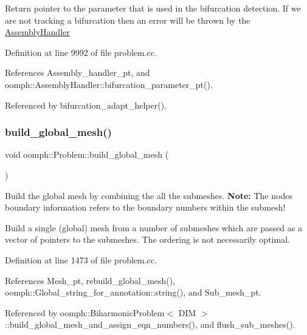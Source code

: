 Return pointer to the parameter that is used in the bifurcation detection. If we are not tracking a bifurcation then an error will be thrown by the \hyperlink{classoomph_1_1AssemblyHandler}{Assembly\+Handler} 

Definition at line 9992 of file problem.\+cc.



References Assembly\+\_\+handler\+\_\+pt, and oomph\+::\+Assembly\+Handler\+::bifurcation\+\_\+parameter\+\_\+pt().



Referenced by bifurcation\+\_\+adapt\+\_\+helper().

\mbox{\label{classoomph_1_1Problem_a0faad6f705a6dc0ffe27229f9104ed7c}} 
\subsubsection{\texorpdfstring{build\+\_\+global\+\_\+mesh()}{build\_global\_mesh()}}
{\footnotesize\ttfamily void oomph\+::\+Problem\+::build\+\_\+global\+\_\+mesh (\begin{DoxyParamCaption}{ }\end{DoxyParamCaption})}



Build the global mesh by combining the all the submeshes. {\bfseries Note\+:} The nodes boundary information refers to the boundary numbers within the submesh! 

Build a single (global) mesh from a number of submeshes which are passed as a vector of pointers to the submeshes. The ordering is not necessarily optimal. 

Definition at line 1473 of file problem.\+cc.



References Mesh\+\_\+pt, rebuild\+\_\+global\+\_\+mesh(), oomph\+::\+Global\+\_\+string\+\_\+for\+\_\+annotation\+::string(), and Sub\+\_\+mesh\+\_\+pt.



Referenced by oomph\+::\+Biharmonic\+Problem$<$ D\+I\+M $>$\+::build\+\_\+global\+\_\+mesh\+\_\+and\+\_\+assign\+\_\+eqn\+\_\+numbers(), and flush\+\_\+sub\+\_\+meshes().

\mbox{\label{classoomph_1_1Problem_a220816aebf8c74c6c524088e3da4d793}} 
